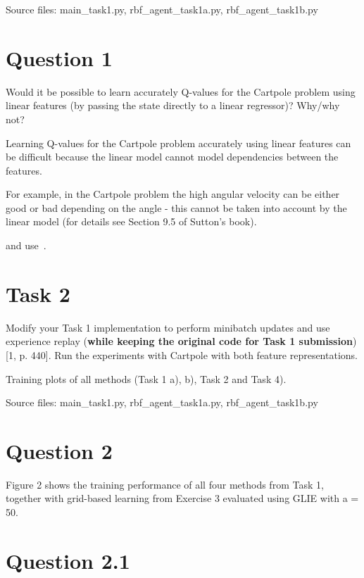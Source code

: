 \documentclass[12pt]{article}
\begin{document}
\noindent
Source files: main\_task1.py, rbf\_agent\_task1a.py, rbf\_agent\_task1b.py 


\section*{Question 1}

Would it be possible to learn accurately Q-values for the Cartpole
problem using linear features (by passing the state directly to a linear regressor)? Why/why
not?
\newline

Learning Q-values for the Cartpole problem accurately using linear features can be difficult because the linear model cannot model dependencies between the features.
\newline

For example, in the Cartpole problem the high angular velocity can be either good or bad depending on the angle - this cannot be taken into account by the linear model (for details see Section 9.5 of Sutton's book).
\newline

and use~\cite{sutton2018reinforcement}.

\pagebreak


\section*{Task 2}

Modify your Task 1 implementation to perform minibatch updates and
use experience replay (\textbf{while keeping the original code for Task 1 submission}) [1, p. 440].
Run the experiments with Cartpole with both feature representations.
\newline

Training plots of all methods (Task 1 a), b), Task 2 and Task 4).
\newline

\noindent
Source files: main\_task1.py, rbf\_agent\_task1a.py, rbf\_agent\_task1b.py 

\section*{Question 2}

Figure 2 shows the training performance of all four methods from Task 1, together
with grid-based learning from Exercise 3 evaluated using GLIE with a = 50.

\section*{Question 2.1}
\end{document}
